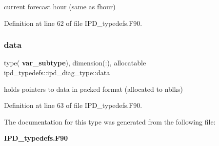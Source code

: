 current forecast hour (same as fhour) 



Definition at line 62 of file I\+P\+D\+\_\+typedefs.\+F90.

\mbox{\label{structipd__typedefs_1_1ipd__diag__type_a7d584d1547e92e53d293c8c7525b30e3}} 
\subsubsection{data}
{\footnotesize\ttfamily type(\textbf{ var\+\_\+subtype}), dimension(\+:), allocatable ipd\+\_\+typedefs\+::ipd\+\_\+diag\+\_\+type\+::data}



holds pointers to data in packed format (allocated to nblks) 



Definition at line 63 of file I\+P\+D\+\_\+typedefs.\+F90.



The documentation for this type was generated from the following file\+:\begin{DoxyCompactItemize}
\item 
\textbf{ I\+P\+D\+\_\+typedefs.\+F90}\end{DoxyCompactItemize}
